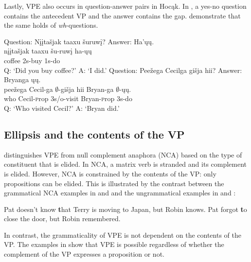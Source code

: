 \documentclass[output=paper]{LSP/langsci}
\begin{document}
Lastly, VPE also occurs in question-answer pairs in Hocąk. In , a yes-no question contains the antecedent VP and the answer contains the gap.  demonstrate that the same holds of \emph{wh}-questions.

\ea\label{ex:johnson:28}
\ea\label{ex:johnson:28a}
\glll Question: {Nįįtašjak taaxu} šuruwį? Answer: Ha'ųų.\\
{} {nįįtašjak taaxu} šu-ruwį {} ha-ųų\\
{} coffee {\textsc 2s}-buy {} {\textsc 1s}-do\\
 \trans Q: `Did you buy coffee?' A: `I did.'
\ex\label{ex:johnson:28b}
\glll Question: Peežega Cecilga {gišja hii}? Answer: Bryanga ųų.\\
{} peežega Cecil-ga $\emptyset$-{gišja hii} {} Bryan-ga $\emptyset$-ųų.\\
{} who Cecil-{\textsc prop} {\textsc 3s/o}-visit {} Bryan-{\textsc prop} {\textsc 3s}-do\\
\trans Q: `Who visited Cecil?' A: `Bryan did.'
\z
\z


\subsection{Ellipsis and the contents of the VP}\label{sec:johnson:3.2}

\citet{Goldberg2005} distinguishes VPE from null complement anaphora (NCA) based on the type of constituent that is elided. In NCA, a matrix verb is stranded and its complement is elided. However, NCA is constrained by the contents of the VP: only propositions can be elided. This is illustrated by the contrast between the grammatical NCA examples in  and  and the ungrammatical examples in  and :

\ea\label{ex:johnson:29}
\ea\label{ex:johnson:29a}
Pat doesn't know {\textbf that Terry is moving to Japan}, but Robin knows.
\label{ex:johnson:29b}
\ex\label{ex:johnson:29c}
Pat forgot {\textbf to close the door}, but Robin remembered.
\label{ex:johnson:29d}
\z
\z

In contrast, the grammaticality of VPE is not dependent on the contents of the VP. The examples in  show that VPE is possible regardless of whether the complement of the VP expresses a proposition or not.
\end{document}
